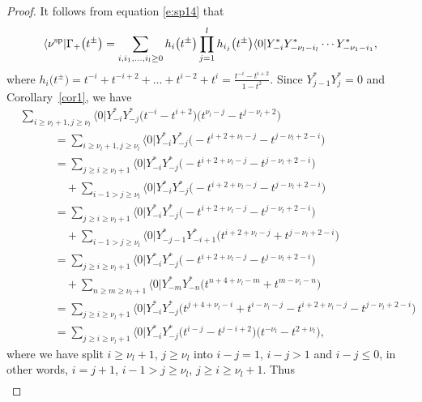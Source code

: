 \documentclass[pdftex]{sigma}
\numberwithin{equation}{section}
\begin{document}
\begin{proof}It follows from equation \eqref{e:sp14} that
\begin{align}\label{e:sp10}
\langle\nu^{\rm sp}|\Gamma_+\big(t^{\pm}\big)
=\sum_{i,i_1,\dots,i_l\geq 0}h_i\big(t^{\pm}\big)\prod^l_{j=1}h_{i_j}\big(t^{\pm}\big)\langle 0|Y^*_{-i}Y^*_{-\nu_l-i_l}\cdots Y^*_{-\nu_1-i_1},
\end{align}
where $h_i\big(t^{\pm}\big)=t^{-i}+t^{-i+2}+\dots+t^{i-2}+t^i=\frac{t^{-i}-t^{i+2}}{1-t^2}$.
Since $Y^*_{j-1}Y^*_{j}=0$ and Corollary~\ref{cor1}, we have
\begin{align*}
&\sum_{i\geq \nu_l+1,j\geq \nu_l}\langle 0|Y^*_{-i}Y^*_{-j}\bigl(t^{-i}-t^{i+2}\bigr)\bigl(t^{\nu_l-j}-t^{j-\nu_l+2}\bigr)\\
&\qquad\quad{}=\sum_{i\geq \nu_l+1,j\geq \nu_l}\langle 0|Y^*_{-i}Y^*_{-j}\bigl(-t^{i+2+\nu_l-j}-t^{j-\nu_l+2-i}\bigr)\\
&\qquad\quad{}=\sum_{j\geq i\geq \nu_l+1}\langle 0|Y^*_{-i}Y^*_{-j}\bigl(-t^{i+2+\nu_l-j}-t^{j-\nu_l+2-i}\bigr)\\
&\qquad\qquad{}+\sum_{i-1> j\geq\nu_l}\langle 0|Y^*_{-i}Y^*_{-j}\bigl(-t^{i+2+\nu_l-j}-t^{j-\nu_l+2-i}\bigr)\\
&\qquad\quad{}=\sum_{j\geq i\geq \nu_l+1}\langle 0|Y^*_{-i}Y^*_{-j}\bigl(-t^{i+2+\nu_l-j}-t^{j-\nu_l+2-i}\bigr)\\
&\qquad\qquad{}+\sum_{i-1> j\geq\nu_l}\langle 0|Y^*_{-j-1}Y^*_{-i+1}\bigl(t^{i+2+\nu_l-j}+t^{j-\nu_l+2-i}\bigr)\\
&\qquad\quad{}=\sum_{j\geq i\geq \nu_l+1}\langle 0|Y^*_{-i}Y^*_{-j}\bigl(-t^{i+2+\nu_l-j}-t^{j-\nu_l+2-i}\bigr)\\
&\qquad\qquad{}+\sum_{n\geq m\geq \nu_l+1}\langle 0|Y^*_{-m}Y^*_{-n}\bigl(t^{n+4+\nu_l-m}+t^{m-\nu_l-n}\bigr)\\
&\qquad\quad{}=\sum_{j\geq i\geq \nu_l+1}\langle 0|Y^*_{-i}Y^*_{-j}\bigl(t^{j+4+\nu_l-i}+t^{i-\nu_l-j}-t^{i+2+\nu_l-j}-t^{j-\nu_l+2-i}\bigr)\\
&\qquad\quad{}=\sum_{j\geq i\geq \nu_l+1}\langle 0|Y^*_{-i}Y^*_{-j}\bigl(t^{i-j}-t^{j-i+2}\bigr)\bigl(t^{-\nu_l}-t^{2+\nu_l}\bigr),
\end{align*}
where we have split $i\geq \nu_l+1$, $j\geq \nu_l$ into $i-j=1$, $i-j>1$ and $i-j\leq 0$, in other words, $i=j+1$, $i-1> j\geq\nu_l$, $j\geq i\geq \nu_l+1$.
Thus
\begin{align*}

\end{align*}
\end{proof}
\end{document}

